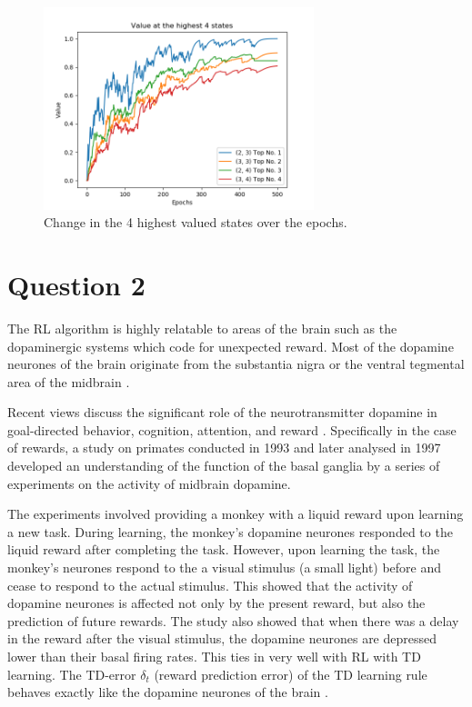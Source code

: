 \documentclass[10pt, a4paper]{article}
\begin{document}
\begin{figure}[H]
	\centering
	\includegraphics[width=0.7\textwidth]{fig/value_iteration.png}
	\caption{Change in the 4 highest valued states over the epochs.}
	\label{values}
\end{figure}

\section*{Question 2}
The RL algorithm is highly relatable to areas of the brain such as the dopaminergic systems \cite{roelfsema2018control} which code for unexpected reward. Most of the dopamine neurones of the brain originate from the substantia nigra or the ventral tegmental area of the midbrain \cite{delong2000basal}. 

Recent views discuss the significant role of the neurotransmitter dopamine in  goal-directed behavior, cognition, attention, and reward \cite{schultz2002getting}. Specifically in the case of rewards, a study on primates conducted in 1993 \cite{schultz1993responses} and later analysed in 1997 \cite{schultz1997neural} \cite{schultz1998predictive} developed an understanding of the function of the basal ganglia by a series of experiments on the activity of midbrain dopamine. 

The experiments involved providing a monkey with a liquid reward upon learning a new task. During learning, the monkey's dopamine neurones responded to the liquid reward after completing the task. However, upon learning the task, the monkey's neurones respond to the a visual stimulus (a small light) before and cease to respond to the actual stimulus. This showed that the activity of dopamine neurones is affected not only by the present reward, but also the prediction of future rewards. The study also showed that when there was a delay in the reward after the visual stimulus, the dopamine neurones are depressed lower than their basal firing rates. This ties in very well with RL with TD learning. The TD-error $\delta_t$ (reward prediction error) of the TD learning rule behaves exactly like the dopamine neurones of the brain \cite{doya2000complementary}.
\end{document}
